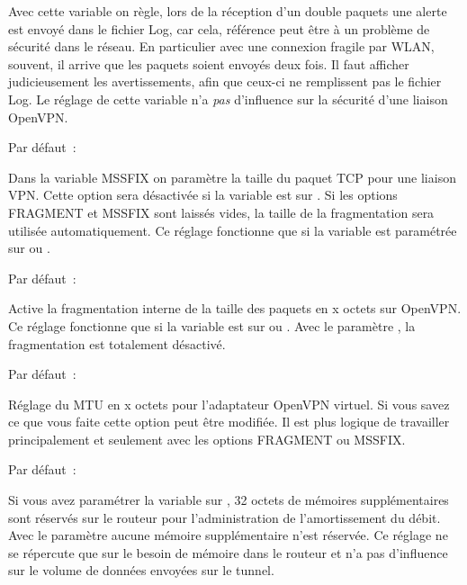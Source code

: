 \begin{description}
  Avec cette variable on règle, lors de la réception d'un double paquets une alerte
  est envoyé dans le fichier Log, car cela, référence peut être à un problème
  de sécurité dans le réseau. En particulier avec une connexion fragile par WLAN,
  souvent, il arrive que les paquets soient envoyés deux fois. Il faut afficher
  judicieusement les avertissements, afin que ceux-ci ne remplissent pas le
  fichier Log. Le réglage de cette variable n'a \emph{pas} d'influence sur la
  sécurité d'une liaison OpenVPN.


  Par défaut~: 

  Dans la variable MSSFIX on paramètre la taille du paquet TCP pour une liaison VPN.
  Cette option sera désactivée si la variable est sur .
  Si les options FRAGMENT et MSSFIX sont laissés vides, la taille de la fragmentation
  sera utilisée automatiquement. Ce réglage fonctionne que si la variable est
  paramétrée sur  ou .


  Par défaut~: 

  Active la fragmentation interne de la taille des paquets en x octets sur OpenVPN.
  Ce réglage fonctionne que si la variable est sur  ou .
  Avec le paramètre , la fragmentation est
  totalement désactivé.


  Par défaut~: 

  Réglage du MTU en x octets pour l'adaptateur OpenVPN virtuel. Si vous savez ce que
  vous faite cette option peut être modifiée. Il est plus logique de travailler
  principalement et seulement avec les options FRAGMENT ou MSSFIX.


  Par défaut~: 

  Si vous avez paramétrer la variable sur ,
  32 octets de mémoires supplémentaires sont réservés sur le routeur pour 
  l'administration de l'amortissement du débit. Avec le paramètre
   aucune mémoire supplémentaire n'est réservée.
  Ce réglage ne se répercute que sur le besoin de mémoire dans le routeur et n'a
  pas d'influence sur le volume de données envoyées sur le tunnel.


\end{description}
